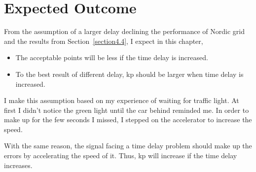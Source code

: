 \section{Expected Outcome} %
\label{section5.2}
From the assumption of a larger delay declining the performance of Nordic grid and the results from Section~\ref{section4.4}, I expect in this chapter, 

\begin{itemize}
    \item The acceptable points will be less if the time delay is increased.  
    \item To the best result of different delay, kp should be larger when time delay is increased.  
\end{itemize}


I make this assumption based on my experience of waiting for traffic light. At first I didn't notice the green light until the car behind reminded me. In order to make up for the few seconds I missed, I stepped on the accelerator to increase the speed.  

With the same reason, the signal facing a time delay problem should make up the errors by accelerating the speed of it. Thus, kp will increase if the time delay increases.
